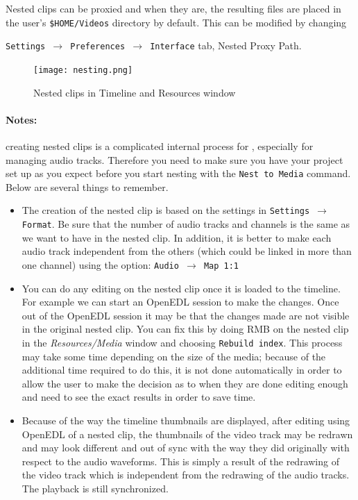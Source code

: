 Nested clips can be proxied and when they are, the resulting files
are placed in the user's \texttt{\$HOME/Videos} directory by default.  This
can be modified by changing

\texttt{Settings $\rightarrow$ Preferences $\rightarrow$ Interface}
tab, Nested Proxy Path.

\begin{figure}[htpb]
	\centering
	\texttt{[image: nesting.png]}
	\caption{Nested clips in Timeline and Resources window}
	\label{fig:nesting}
\end{figure}

\paragraph{Notes:} creating nested clips is a complicated internal process for \CGG{}, especially for managing audio tracks. Therefore you need to make sure you have your project set up as you expect before you start nesting with the \texttt{Nest to Media} command.  Below are several things to remember.

\begin{itemize}
	\item The creation of the nested clip is based on the settings in \texttt{Settings $\rightarrow$ Format}. Be sure that the number of audio tracks and channels is the same as we want to have in the nested clip. In addition, it is better to make each audio track independent from the others (which could be linked in more than one channel) using the option: \texttt{Audio $\rightarrow$ Map 1:1}
	\item You can do any editing on the nested clip once it is loaded to the timeline. For example we can start an OpenEDL session to make the changes. Once out of the OpenEDL session it may be that the changes made are not visible in the original nested clip. You can fix this by doing RMB on the nested clip in the \textit{Resources/Media} window and choosing \texttt{Rebuild index}. This process may take some time depending on the size of
the media; because of the additional time required to do this, it is not done automatically in order to allow the user to make the decision as to when they are done editing enough and need to see the exact results
in order to save time.
	\item Because of the way the timeline thumbnails are displayed, after editing using OpenEDL of a
nested clip, the thumbnails of the video track may be redrawn and may look different and out of sync with the
way they did originally with respect to the audio waveforms. This is simply a result of the redrawing of the
video track which is independent from the redrawing of the audio tracks. The playback is still synchronized.
\end{itemize}

